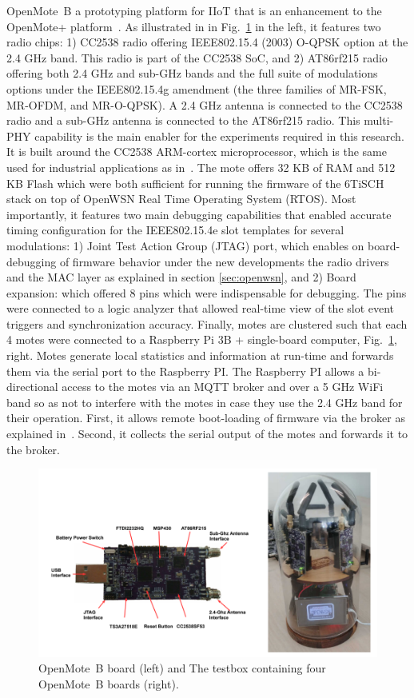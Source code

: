 \documentclass[journal]{IEEEtran}
\begin{document}
OpenMote~B a prototyping platform for IIoT that is an enhancement to the OpenMote+ platform~\cite{tusetopenmote}. 
As illustrated in in Fig.~\ref{fig:mote_ot} in the left,  it features two radio chips: 
	1) CC2538 radio offering IEEE802.15.4 (2003) O-QPSK option at the 2.4 GHz band. This radio is part of the CC2538 SoC, and 
    2) AT86rf215 radio offering both 2.4 GHz and sub-GHz bands and the full suite of modulations options under the IEEE802.15.4g amendment (the three families of MR-FSK, MR-OFDM, and MR-O-QPSK). 
A 2.4 GHz antenna is connected to the CC2538 radio and a sub-GHz antenna is connected to the AT86rf215 radio.
This multi-PHY capability is the main enabler for the experiments required in this research. 
It is built around the CC2538 ARM-cortex microprocessor, which is the same used for industrial applications as in~\cite{civerchia17industrial}.
The mote offers 32 KB of RAM and 512 KB Flash which were both sufficient for running the firmware of the 6TiSCH stack on top of OpenWSN Real Time Operating System (RTOS). 
Most importantly, it features two main debugging capabilities that enabled accurate timing configuration for the IEEE802.15.4e slot templates for several modulations:
1) Joint Test Action Group (JTAG) port, which enables on board-debugging of firmware behavior under the new developments the radio drivers and the MAC layer as explained in section \ref{sec:openwsn}, and 
2) Board expansion: which offered 8 pins which were indispensable for debugging. The pins were connected to a logic analyzer that allowed real-time view of the slot event triggers and synchronization accuracy.
Finally, motes are clustered such that each 4 motes were connected to a Raspberry Pi 3B + single-board computer, Fig.~\ref{fig:mote_ot}, right.
Motes generate local statistics and information at run-time and forwards them via the serial port to the Raspberry PI. 
The Raspberry PI allows a bi-directional access to the motes via an MQTT broker and over a 5 GHz WiFi band so as not to interfere with the motes in case they use the 2.4 GHz band for their operation.
First, it allows remote boot-loading of firmware via the broker as explained in~\cite{munoz19opentestbed}.
Second, it collects the serial output of the motes and forwards it to the  broker. 

\begin{figure}
	\centering
	\includegraphics[width=0.90\columnwidth]{mote_ot}
	\caption{OpenMote~B board (left) and The testbox containing four OpenMote~B boards (right).}
    \label{fig:mote_ot}
\end{figure}
\end{document}
